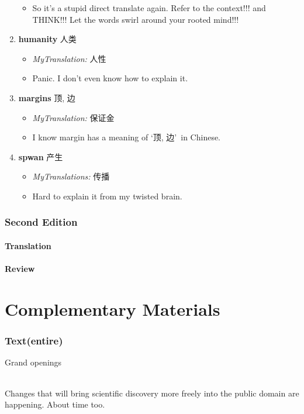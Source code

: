 \documentclass[a4paper, 12pt, UTF8]{article}
\begin{document}
\begin{enumerate}[\hspace{0.5cm} 1.]
\begin{itemize}
              \item So it's a stupid direct translate again. Refer to the context!!! and THINK!!! Let the words swirl around your rooted mind!!!
          \end{itemize}
    \item {\bfseries humanity} 人类
          \begin{itemize}
              \item \emph{MyTranslation:} 人性
              \item Panic. I don't even know how to explain it. 
          \end{itemize}
    \item {\bfseries margins} 顶, 边
          \begin{itemize}
              \item \emph{MyTranslation:} 保证金 
              \item I know margin has a meaning of \lq 顶, 边\rq\ in Chinese. 
          \end{itemize}
    \item {\bfseries spwan} 产生
          \begin{itemize}
              \item \emph{MyTranslations:} 传播
              \item Hard to explain it from my twisted brain.
          \end{itemize}
\end{enumerate}

\newpage
\section{Second Edition}
\subsection{Translation}
\subsection{Review}

\newpage
\part{Complementary Materials}

\newpage
\section{Text(entire)}
\begin{bfseries}
    \Large
    Grand openings
    \paragraph*{}
    \large
    Changes that will bring scientific discovery more freely into the public domain are happening. About time too.
\end{bfseries}
\end{document}
